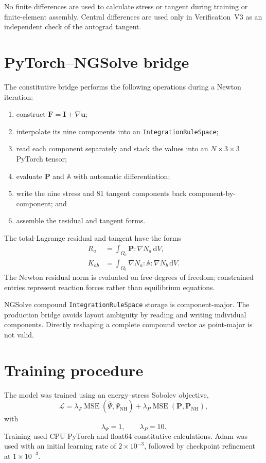 \documentclass[11pt,a4paper]{article}
\newcommand{\F}{\mathbf{F}}
\newcommand{\Pstress}{\mathbf{P}}
\newcommand{\Aten}{\mathbb{A}}
\newcommand{\Iten}{\mathbf{I}}
\begin{document}
No finite differences are used to calculate stress or tangent during
training or finite-element assembly. Central differences are used only in
Verification~V3 as an independent check of the autograd tangent.

\section{PyTorch--NGSolve bridge}

The constitutive bridge performs the following operations during a Newton
iteration:
\begin{enumerate}[label=\arabic*.]
  \item construct $\F=\Iten+\nabla\mathbf{u}$;
  \item interpolate its nine components into an
        \texttt{IntegrationRuleSpace};
  \item read each component separately and stack the values into an
        $N\times3\times3$ PyTorch tensor;
  \item evaluate $\Pstress$ and $\Aten$ with automatic differentiation;
  \item write the nine stress and 81 tangent components back
        component-by-component; and
  \item assemble the residual and tangent forms.
\end{enumerate}

The total-Lagrange residual and tangent have the forms
\begin{align}
  R_a &=
  \int_{\Omega_0}
  \Pstress:\nabla N_a\,\mathrm{d}V,\\
  K_{ab} &=
  \int_{\Omega_0}
  \nabla N_a:\Aten:\nabla N_b\,\mathrm{d}V.
\end{align}
The Newton residual norm is evaluated on free degrees of freedom; constrained
entries represent reaction forces rather than equilibrium equations.

NGSolve compound \texttt{IntegrationRuleSpace} storage is component-major.
The production bridge avoids layout ambiguity by reading and writing
individual components. Directly reshaping a complete compound vector as
point-major is not valid.

\section{Training procedure}

The model was trained using an energy--stress Sobolev objective,
\begin{equation}
  \mathcal{L}
  =
  \lambda_\Psi
  \operatorname{MSE}
  \left(\widehat{\Psi},\Psi_{\mathrm{NH}}\right)
  +
  \lambda_P
  \operatorname{MSE}
  \left(\Pstress,\Pstress_{\mathrm{NH}}\right),
  \label{eq:loss}
\end{equation}
with
\begin{equation}
  \lambda_\Psi=1,\qquad \lambda_P=10.
\end{equation}
Training used CPU PyTorch and float64 constitutive calculations. Adam was
used with an initial learning rate of $2\times10^{-3}$, followed by checkpoint
refinement at $1\times10^{-3}$.
\end{document}
